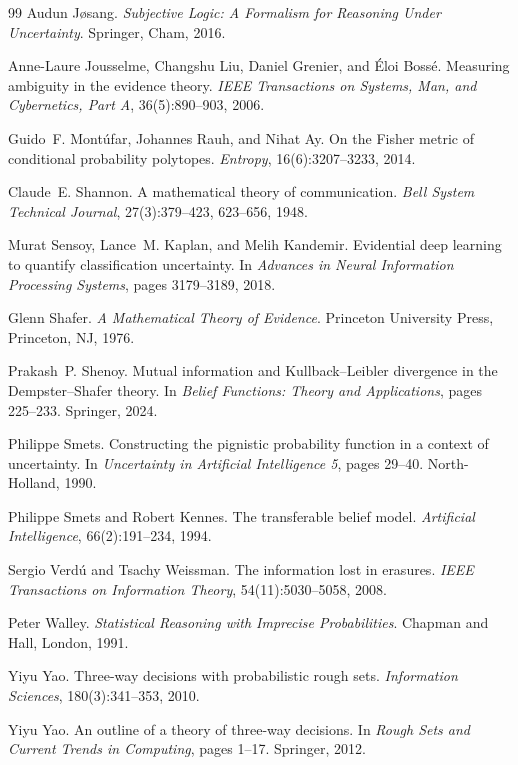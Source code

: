 \documentclass[11pt]{article}
\newcommand{\1}{\mathbf{1}}
\begin{document}
\begin{thebibliography}{99}
Audun J\o sang.
\newblock \emph{Subjective Logic: A Formalism for Reasoning Under Uncertainty}.
\newblock Springer, Cham, 2016.

Anne-Laure Jousselme, Changshu Liu, Daniel Grenier, and \'{E}loi Boss\'e.
\newblock Measuring ambiguity in the evidence theory.
\newblock \emph{IEEE Transactions on Systems, Man, and Cybernetics, Part A}, 36(5):890--903, 2006.

Guido~F. Mont\'ufar, Johannes Rauh, and Nihat Ay.
\newblock On the {F}isher metric of conditional probability polytopes.
\newblock \emph{Entropy}, 16(6):3207--3233, 2014.

Claude~E. Shannon.
\newblock A mathematical theory of communication.
\newblock \emph{Bell System Technical Journal}, 27(3):379--423, 623--656, 1948.

Murat Sensoy, Lance~M. Kaplan, and Melih Kandemir.
\newblock Evidential deep learning to quantify classification uncertainty.
\newblock In \emph{Advances in Neural Information Processing Systems}, pages 3179--3189, 2018.

Glenn Shafer.
\newblock \emph{A Mathematical Theory of Evidence}.
\newblock Princeton University Press, Princeton, NJ, 1976.

Prakash~P. Shenoy.
\newblock Mutual information and {K}ullback--{L}eibler divergence in the {D}empster--{S}hafer theory.
\newblock In \emph{Belief Functions: Theory and Applications}, pages 225--233. Springer, 2024.

Philippe Smets.
\newblock Constructing the pignistic probability function in a context of uncertainty.
\newblock In \emph{Uncertainty in Artificial Intelligence 5}, pages 29--40. North-Holland, 1990.

Philippe Smets and Robert Kennes.
\newblock The transferable belief model.
\newblock \emph{Artificial Intelligence}, 66(2):191--234, 1994.

Sergio Verd\'u and Tsachy Weissman.
\newblock The information lost in erasures.
\newblock \emph{IEEE Transactions on Information Theory}, 54(11):5030--5058, 2008.

Peter Walley.
\newblock \emph{Statistical Reasoning with Imprecise Probabilities}.
\newblock Chapman and Hall, London, 1991.

Yiyu Yao.
\newblock Three-way decisions with probabilistic rough sets.
\newblock \emph{Information Sciences}, 180(3):341--353, 2010.

Yiyu Yao.
\newblock An outline of a theory of three-way decisions.
\newblock In \emph{Rough Sets and Current Trends in Computing}, pages 1--17. Springer, 2012.

\end{thebibliography}
\end{document}
